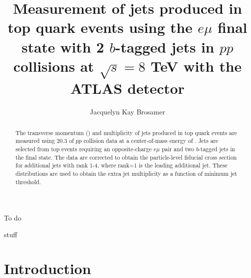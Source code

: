 \documentclass[12pt]{ucthesis}
\begin{document}

\title{Measurement of jets produced in top quark events using the $e\mu$ final state with 2 $b$-tagged jets in $pp$ collisions at $\sqrt{s}=8$ TeV with the ATLAS detector}
\author{Jacquelyn Kay Brosamer}
\prevdegrees{}




\maketitle
\approvalpage
\copyrightpage
\begin{abstract}
 The transverse momentum (\pt) and multiplicity of jets produced in top quark events are measured using 20.3 \ifb of $pp$ collision data at a center-of-mass energy of  \tev. Jets are selected from top events requiring an opposite-charge $e\mu$ pair and two $b$-tagged jets in the final state. 
The data are corrected to obtain the particle-level fiducial cross section \sigmapt for additional jets with rank 1-4, where rank=1 is the leading additional jet. These distributions are used to obtain the extra jet multiplicity as a function of minimum jet \pt threshold.
\end{abstract}
\begin{frontmatter}

\tableofcontents
\clearpage
\listoffigures
\clearpage
\listoftables

\begin{acknowledgements}
To do
\end{acknowledgements}

\end{frontmatter}

\pagestyle{headings}
stuff\cite{ghostmatch}
\chapter{Introduction}
\label{ch:intro}

\end{document}
